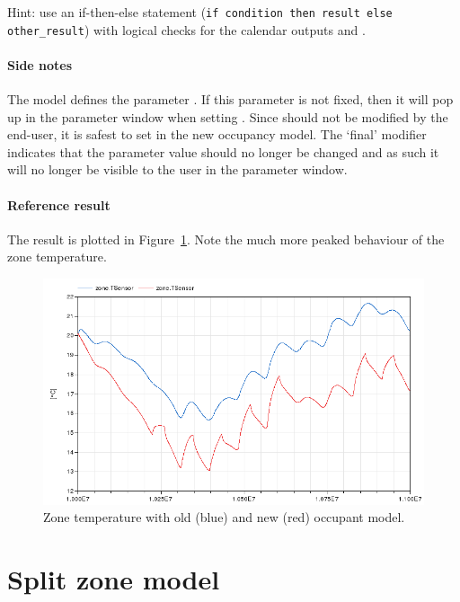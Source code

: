 \documentclass[10pt,a4paper]{article}
\begin{document}
Hint: use an if-then-else statement (\texttt{if condition then result else other\_result}) with logical checks for the calendar outputs  and .

\paragraph{Side notes}
The model  
defines the parameter .
If this parameter is not fixed, then it will pop up in the parameter window when
setting . Since  should not be modified by the end-user,
it is safest to set  in the new occupancy model.
The `final' modifier indicates that the parameter value should no longer be changed
and as such it will no longer be visible to the user in the parameter window.

\paragraph{Reference result}
The result 
is plotted in Figure~\ref{fig:res4}.
Note the much more peaked behaviour of the zone temperature.



\begin{figure}
\centering
\includegraphics[scale=0.7]{Example4.png}
\caption{Zone temperature with old (blue) and new (red) occupant model.}
\label{fig:res4}
\end{figure}


\section{Split zone model}
\end{document}
